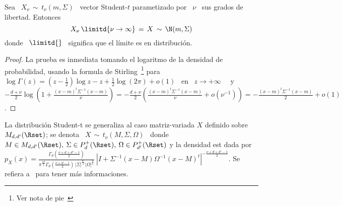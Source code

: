 \begin{lema}
\label{Lem:MP:LimiteGaussiana}
%
  Sea \ $X_\nu \, \sim \, t_\nu(m,\Sigma)$ \ vector Student-$t$ parametizado por
  \ $\nu$ \ sus grados de libertad. Entonces
  \[
  X_\nu \, \limitd{\nu \to \infty} \, = \, X \, \sim \, \N(m,\Sigma)
  \]
  donde  \  $\displaystyle  \limitd{}$  \   significa  que  el  l\'imite  es  en
  distribuci\'on.
\end{lema}
\begin{proof}
  La prueba  es inmediata tomando el  logaritmo de la  densidad de probabilidad,
  usando   la  formula   de   Stirling~\footnote{Ver nota de pie~}  para \ $\log\Gamma(z)  = \left(  z -
    \frac12 \right)  \log z  - z +  \frac12 \log(2 \pi)  + o(1)$  \ en \  $z \to
  +\infty$~\cite{Sti30, AbrSte70, GraRyz15} \ y \ $-\frac{d+\nu}{2} \log\left( 1
    +  \frac{(x-m)^t \Sigma^{-1} (x-m)}{\nu}  \right) =  -\frac{d+\nu}{2} \left(
    \frac{(x-m)^t \Sigma^{-1} (x-m)}{\nu} + o\left( \nu^{-1} \right) \right) = -
  \frac{(x-m)^t \Sigma^{-1} (x-m)}{2} + o(1)$.
\end{proof}




La distribuci\'on  Student-t se generaliza  al caso matriz-variada  $X$ definido
sobre $M_{d,d'}(\Rset)$;  se denota  \ $X \,  \sim \,  t_\nu(M,\Sigma,\Omega)$ \
donde  \ $M  \in  M_{d,d'}(\Rset), \:  \Sigma  \in P_d^+(\Rset),  \: \Omega  \in
P_{d'}^+(\Rset)$   y  la  densidad   est  dada   por  $\displaystyle   p_X(x)  =
\frac{\Gamma_d\left(      \frac{\nu+d+d'-1}{2}\right)}{\pi^{\frac{\nu     d}{2}}
  \Gamma_d\left(       \frac{\nu+d-1}{2}\right)      \,       \left|      \Sigma
  \right|^{\frac{d'}{2}}  \left|  \Omega \right|^{\frac{d}{2}}}  \:  \left| I  +
  \Sigma^{-1}  (x-M) \Omega^{-1}  (x-M)^t \right|^{-  \frac{\nu+d+d'-1}{2}}$. Se
refiera a~\cite[Cap.~4]{GupNag99} para tener m\'as informaciones.